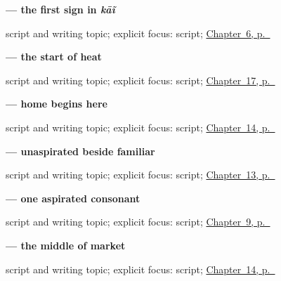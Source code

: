 \noindent\begin{minipage}[t]{\linewidth}
\raggedright
\textbf{ — the first sign in \emph{kāĩ}}\par
\footnotesize script and writing topic; explicit focus: script; \hyperref[ch:mw-name-question]{Chapter~6, p.~\pageref*{ch:mw-name-question}}
\end{minipage}\par\smallskip

\noindent\begin{minipage}[t]{\linewidth}
\raggedright
\textbf{ — the start of heat}\par
\footnotesize script and writing topic; explicit focus: script; \hyperref[ch:mw-weather-six]{Chapter~17, p.~\pageref*{ch:mw-weather-six}}
\end{minipage}\par\smallskip

\noindent\begin{minipage}[t]{\linewidth}
\raggedright
\textbf{ — home begins here}\par
\footnotesize script and writing topic; explicit focus: script; \hyperref[ch:mw-places-three]{Chapter~14, p.~\pageref*{ch:mw-places-three}}
\end{minipage}\par\smallskip

\noindent\begin{minipage}[t]{\linewidth}
\raggedright
\textbf{ — unaspirated beside familiar }\par
\footnotesize script and writing topic; explicit focus: script; \hyperref[ch:mw-family-twelve]{Chapter~13, p.~\pageref*{ch:mw-family-twelve}}
\end{minipage}\par\smallskip

\noindent\begin{minipage}[t]{\linewidth}
\raggedright
\textbf{ — one aspirated consonant}\par
\footnotesize script and writing topic; explicit focus: script; \hyperref[ch:mw-see-you-later]{Chapter~9, p.~\pageref*{ch:mw-see-you-later}}
\end{minipage}\par\smallskip

\noindent\begin{minipage}[t]{\linewidth}
\raggedright
\textbf{ — the middle of market}\par
\footnotesize script and writing topic; explicit focus: script; \hyperref[ch:mw-places-three]{Chapter~14, p.~\pageref*{ch:mw-places-three}}
\end{minipage}\par\smallskip

